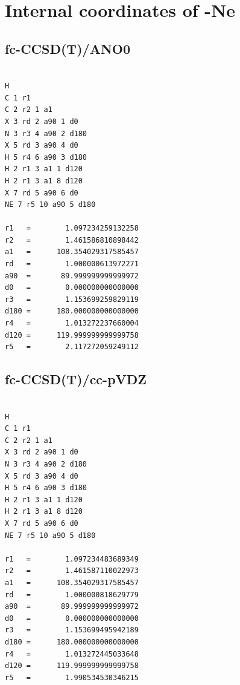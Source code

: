 \section{Internal coordinates of \texorpdfstring{\pan}{CH3CNH+-Ne} -Ne }

\subsection{fc-CCSD(T)/ANO0}

\begin{verbatim}

H
C 1 r1
C 2 r2 1 a1
X 3 rd 2 a90 1 d0
N 3 r3 4 a90 2 d180
X 5 rd 3 a90 4 d0
H 5 r4 6 a90 3 d180
H 2 r1 3 a1 1 d120
H 2 r1 3 a1 8 d120
X 7 rd 5 a90 6 d0
NE 7 r5 10 a90 5 d180

r1   =        1.097234259132258
r2   =        1.461586810898442
a1   =      108.354029317585457
rd   =        1.000000613972271
a90  =       89.999999999999972
d0   =        0.000000000000000
r3   =        1.153699259829119
d180 =      180.000000000000000
r4   =        1.013272237660004
d120 =      119.999999999999758
r5   =        2.117272059249112

\end{verbatim}

\subsection{fc-CCSD(T)/cc-pVDZ}
\begin{verbatim}

H
C 1 r1
C 2 r2 1 a1
X 3 rd 2 a90 1 d0
N 3 r3 4 a90 2 d180
X 5 rd 3 a90 4 d0
H 5 r4 6 a90 3 d180
H 2 r1 3 a1 1 d120
H 2 r1 3 a1 8 d120
X 7 rd 5 a90 6 d0
NE 7 r5 10 a90 5 d180

r1   =        1.097234483689349
r2   =        1.461587110022973
a1   =      108.354029317585457
rd   =        1.000000818629779
a90  =       89.999999999999972
d0   =        0.000000000000000
r3   =        1.153699495942189
d180 =      180.000000000000000
r4   =        1.013272445033648
d120 =      119.999999999999758
r5   =        1.990534530346215
\end{verbatim}
\newpage


